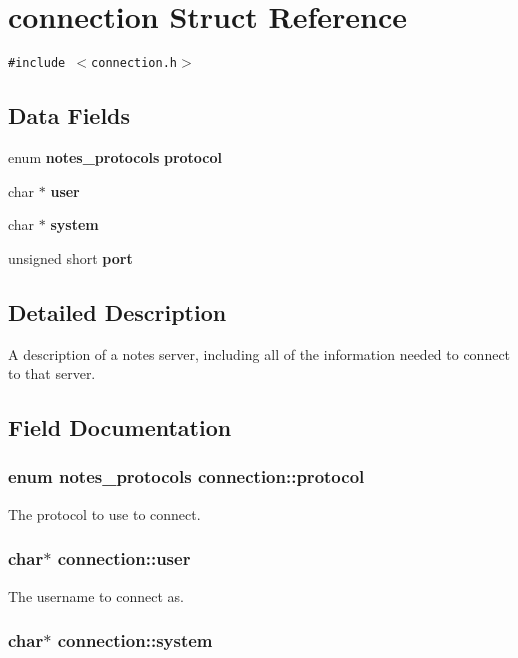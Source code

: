\section{connection Struct Reference}
\label{structconnection}
{\tt \#include $<$connection.h$>$}

\subsection*{Data Fields}
\begin{CompactItemize}
\item 
enum {\bf notes\_\-protocols} {\bf protocol}
\item 
char $\ast$ {\bf user}
\item 
char $\ast$ {\bf system}
\item 
unsigned short {\bf port}
\end{CompactItemize}


\subsection{Detailed Description}
A description of a notes server, including all of the information needed to connect to that server. 

\subsection{Field Documentation}
\subsubsection{\setlength{\rightskip}{0pt plus 5cm}enum {\bf notes\_\-protocols} {\bf connection::protocol}}\label{structconnection_35c8cd2dd787ffa290f2939b7fa808a5}


The protocol to use to connect. 
\subsubsection{\setlength{\rightskip}{0pt plus 5cm}char$\ast$ {\bf connection::user}}\label{structconnection_ae03108bdc391aefb8af5e398b629751}


The username to connect as. 
\subsubsection{\setlength{\rightskip}{0pt plus 5cm}char$\ast$ {\bf connection::system}}\label{structconnection_e25550584aa25e847afaa61fdc8670ed}


